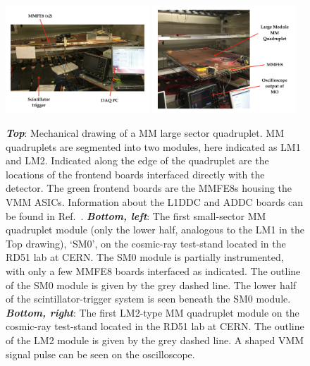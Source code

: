 \begin{figure}[!htb]
    \begin{center}
        \includegraphics[width=0.48\textwidth]{figures/nsw/frontend/mmfe8_sm0_labelledPDF}
        \includegraphics[width=0.48\textwidth]{figures/nsw/frontend/mmfe8_lm2_labelledPDF}
        \caption{
            \textbf{\textit{Top}}: Mechanical drawing of a MM large sector quadruplet.
                MM quadruplets are segmented into two modules, here indicated as LM1 and LM2.
                Indicated along the edge of the quadruplet are the locations of the frontend boards
                interfaced directly with the detector.
                The green frontend boards are the MMFE8s housing the VMM ASICs.
                Information about the L1DDC and ADDC boards can be found in Ref.~\cite{NSWFrontEndChristos}.
            \textbf{\textit{Bottom, left}}: The first small-sector MM quadruplet module (only the lower half, analogous to the LM1 in the Top drawing), `SM0', on the cosmic-ray
                test-stand located in the RD51 lab at CERN.
                The SM0 module is partially instrumented, with only a few MMFE8 boards interfaced
                as indicated.
                The outline of the SM0 module is given by the grey dashed line.
                The lower half of the scintillator-trigger system is seen beneath the SM0 module.
            \textbf{\textit{Bottom, right}}: The first LM2-type MM quadruplet module on the cosmic-ray
                test-stand located in the RD51 lab at CERN.
                The outline of the LM2 module is given by the grey dashed line.
                A shaped VMM signal pulse can be seen on the oscilloscope.
        }
        \label{fig:mm_quad_elx}
    \end{center}
\end{figure}
